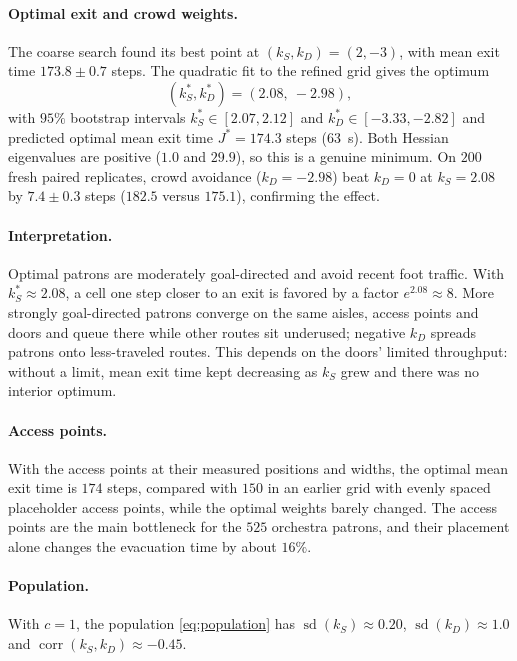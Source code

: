 \documentclass[14pt]{article}
\theoremstyle{definition}
\begin{document}
\paragraph{Optimal exit and crowd weights.} The coarse search found its best point at
$(k_S, k_D) = (2, -3)$, with mean exit time $173.8 \pm 0.7$ steps. The quadratic fit to
the refined grid gives the optimum
\begin{equation}\label{eq:optimum}
  (k_S^*, k_D^*) = (2.08,\ -2.98),
\end{equation}
with $95\%$ bootstrap intervals $k_S^* \in [2.07, 2.12]$ and $k_D^* \in [-3.33, -2.82]$
and predicted optimal mean exit time $J^* = 174.3$ steps (\SI{63}{s}). Both Hessian
eigenvalues are positive ($1.0$ and $29.9$), so this is a genuine minimum. On $200$
fresh paired replicates, crowd avoidance ($k_D = -2.98$) beat $k_D = 0$ at $k_S = 2.08$
by $7.4 \pm 0.3$ steps ($182.5$ versus $175.1$), confirming the effect.

\paragraph{Interpretation.} Optimal patrons are moderately goal-directed and avoid
recent foot traffic. With $k_S^* \approx 2.08$, a cell one step closer to an exit is
favored by a factor $e^{2.08} \approx 8$. More strongly goal-directed patrons converge
on the same aisles, access points and doors and queue there while other routes sit
underused; negative $k_D$ spreads patrons onto less-traveled routes. This depends on
the doors' limited throughput: without a limit, mean exit time kept decreasing as $k_S$
grew and there was no interior optimum.

\paragraph{Access points.} With the access points at their measured positions and
widths, the optimal mean exit time is $174$ steps, compared with $150$ in an earlier
grid with evenly spaced placeholder access points, while the optimal weights barely
changed. The access points are the main bottleneck for the $525$ orchestra patrons, and
their placement alone changes the evacuation time by about $16\%$.

\paragraph{Population.} With $c = 1$, the population \cref{eq:population} has
$\operatorname{sd}(k_S) \approx 0.20$, $\operatorname{sd}(k_D) \approx 1.0$ and
$\operatorname{corr}(k_S, k_D) \approx -0.45$.
\end{document}
